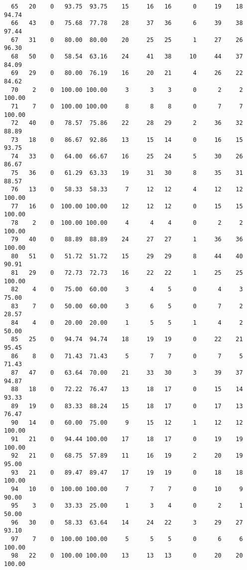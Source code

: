 \begin{verbatim}
  65   20    0   93.75  93.75    15     16   16      0     19    18    94.74
  66   43    0   75.68  77.78    28     37   36      6     39    38    97.44
  67   31    0   80.00  80.00    20     25   25      1     27    26    96.30
  68   50    0   58.54  63.16    24     41   38     10     44    37    84.09
  69   29    0   80.00  76.19    16     20   21      4     26    22    84.62
  70    2    0  100.00 100.00     3      3    3      0      2     2   100.00
  71    7    0  100.00 100.00     8      8    8      0      7     7   100.00
  72   40    0   78.57  75.86    22     28   29      2     36    32    88.89
  73   18    0   86.67  92.86    13     15   14      0     16    15    93.75
  74   33    0   64.00  66.67    16     25   24      5     30    26    86.67
  75   36    0   61.29  63.33    19     31   30      8     35    31    88.57
  76   13    0   58.33  58.33     7     12   12      4     12    12   100.00
  77   16    0  100.00 100.00    12     12   12      0     15    15   100.00
  78    2    0  100.00 100.00     4      4    4      0      2     2   100.00
  79   40    0   88.89  88.89    24     27   27      1     36    36   100.00
  80   51    0   51.72  51.72    15     29   29      8     44    40    90.91
  81   29    0   72.73  72.73    16     22   22      1     25    25   100.00
  82    4    0   75.00  60.00     3      4    5      0      4     3    75.00
  83    7    0   50.00  60.00     3      6    5      0      7     2    28.57
  84    4    0   20.00  20.00     1      5    5      1      4     2    50.00
  85   25    0   94.74  94.74    18     19   19      0     22    21    95.45
  86    8    0   71.43  71.43     5      7    7      0      7     5    71.43
  87   47    0   63.64  70.00    21     33   30      3     39    37    94.87
  88   18    0   72.22  76.47    13     18   17      0     15    14    93.33
  89   19    0   83.33  88.24    15     18   17      0     17    13    76.47
  90   14    0   60.00  75.00     9     15   12      1     12    12   100.00
  91   21    0   94.44 100.00    17     18   17      0     19    19   100.00
  92   21    0   68.75  57.89    11     16   19      2     20    19    95.00
  93   21    0   89.47  89.47    17     19   19      0     18    18   100.00
  94   10    0  100.00 100.00     7      7    7      0     10     9    90.00
  95    3    0   33.33  25.00     1      3    4      0      2     1    50.00
  96   30    0   58.33  63.64    14     24   22      3     29    27    93.10
  97    7    0  100.00 100.00     5      5    5      0      6     6   100.00
  98   22    0  100.00 100.00    13     13   13      0     20    20   100.00

\end{verbatim}
